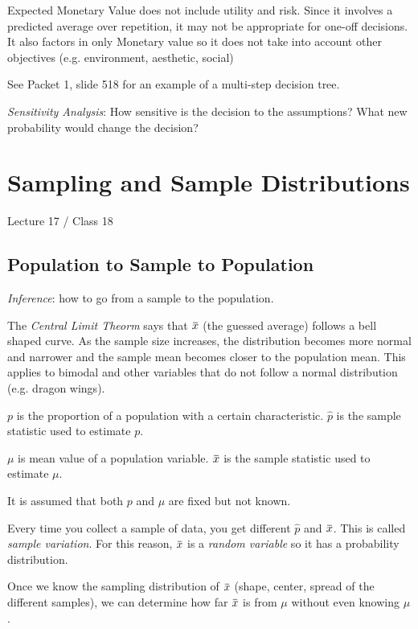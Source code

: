 \documentclass[11pt, oneside]{article}   	%
\newcommand{\overbar}[1]{\mkern 1.5mu\overline{\mkern-1.5mu#1\mkern-1.5mu}\mkern 1.5mu}
\begin{document}
Expected Monetary Value does not include utility and risk. Since it involves a predicted average over repetition, it may not be appropriate for one-off decisions. It also factors in only Monetary value so it does not take into account other objectives (e.g. environment, aesthetic, social)

See Packet 1, slide 518 for an example of a multi-step decision tree.

\textit{Sensitivity Analysis}: How sensitive is the decision to the assumptions? What new probability would change the decision?


\section{Sampling and Sample Distributions}
Lecture 17 / Class 18

\subsection{Population to Sample to Population}

\textit{Inference}: how to go from a sample to the population.

The \textit{Central Limit Theorm} says that $\overbar{x}$ (the guessed average) follows a bell shaped curve. As the sample size increases, the distribution becomes more normal and narrower and the sample mean becomes closer to the population mean. This applies to bimodal and other variables that do not follow a normal distribution (e.g. dragon wings). 

$p$ is the proportion of a population with a certain characteristic. $\hat{p}$ is the sample statistic used to estimate $p$.

$\mu$ is mean value of a population variable. $\overbar{x}$ is the sample statistic used to estimate $\mu$.

It is assumed that both $p$ and $\mu$ are fixed but not known.

Every time you collect a sample of data, you get different $\hat{p}$ and $\overbar{x}$. This is called \textit{sample variation}. For this reason, $\overbar{x}$ is a \textit{random variable} so it has a probability distribution. 

Once we know the sampling distribution of $\overbar{x}$ (shape, center, spread of the different samples), we can determine how far $\overbar{x}$ is from $\mu$ without even knowing $\mu$.
\end{document}
